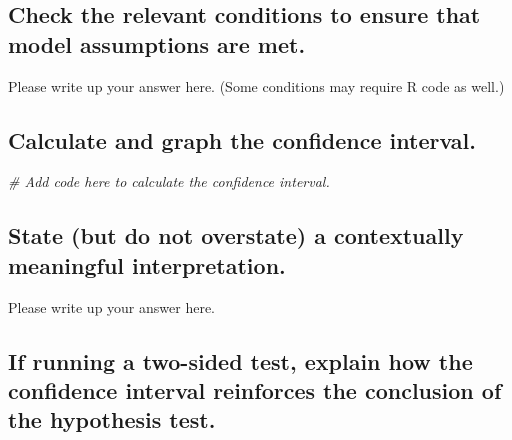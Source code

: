 \documentclass[
]{book}
\newenvironment{Shaded}{\begin{snugshade}}{\end{snugshade}}
\newcommand{\CommentTok}[1]{\textcolor[rgb]{0.56,0.35,0.01}{\textit{#1}}}
\begin{document}
\hypertarget{check-the-relevant-conditions-to-ensure-that-model-assumptions-are-met.-4}{%
\subsection*{Check the relevant conditions to ensure that model assumptions are met.}\label{check-the-relevant-conditions-to-ensure-that-model-assumptions-are-met.-4}}

Please write up your answer here. (Some conditions may require R code as well.)

\hypertarget{calculate-and-graph-the-confidence-interval.}{%
\subsection*{Calculate and graph the confidence interval.}\label{calculate-and-graph-the-confidence-interval.}}

\begin{Shaded}
\begin{Highlighting}[]
\CommentTok{\# Add code here to calculate the confidence interval.}
\end{Highlighting}
\end{Shaded}

\hypertarget{state-but-do-not-overstate-a-contextually-meaningful-interpretation.-1}{%
\subsection*{State (but do not overstate) a contextually meaningful interpretation.}\label{state-but-do-not-overstate-a-contextually-meaningful-interpretation.-1}}

Please write up your answer here.

\hypertarget{if-running-a-two-sided-test-explain-how-the-confidence-interval-reinforces-the-conclusion-of-the-hypothesis-test.}{%
\subsection*{If running a two-sided test, explain how the confidence interval reinforces the conclusion of the hypothesis test.}\label{if-running-a-two-sided-test-explain-how-the-confidence-interval-reinforces-the-conclusion-of-the-hypothesis-test.}}
\end{document}

